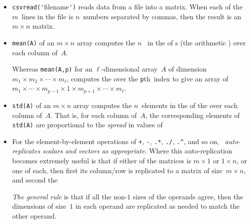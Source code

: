 \begin{table}
\begin{minipage}{\linewidth}
\begin{itemize}
\item  {}\verb|csvread('|filename\verb|')| reads data from a file into a matrix.
When each of the \(m\)~lines in the file is \(n\)~numbers separated by commas, then the result is an \(m\times n\) matrix. 

\item {}\verb|mean(A)| of an \(m\times n\) array computes the \(n\)~ in the  of s (the arithmetic ) over each column of~\(A\).

Whereas \verb|mean(A,p)| for an \(\ell\)-dimensional array~\(A\) of dimension \(m_1\times m_2\times\cdots\times m_\ell\),  computes the  over the \verb|p|th~index to give an array of  \(m_1\times\cdots\times m_{p-1}\times1\times m_{p+1}\times\cdots\times m_\ell\).

\item {}\verb|std(A)| of an \(m\times n\) array computes the \(n\)~elements in the  of the  over each column of~\(A\).  
That is, for each column of~\(A\), the corresponding elements of \verb|std(A)| are proportional to the \emph{spread} in values of 

\item For the element-by-element operations of \verb|+|, \verb|-|, \verb|.*|, \verb|./|, \verb|.^|, and so on, \emph{\script\ auto-replicates scalars and vectors as appropriate}. 
Where this auto-replication becomes extremely useful is that if either of the matrices is \(m\times1\) or \(1\times n\), or one of each, then first its column\slash row is replicated to a matrix of size~\(m\times n\), and second the 

\emph{The general rule} is that if all the non-\(1\) sizes of the operands agree, then the dimensions of size~\(1\) in each operand are replicated as needed to match the other operand.



\end{itemize}
\end{minipage}
\end{table}
